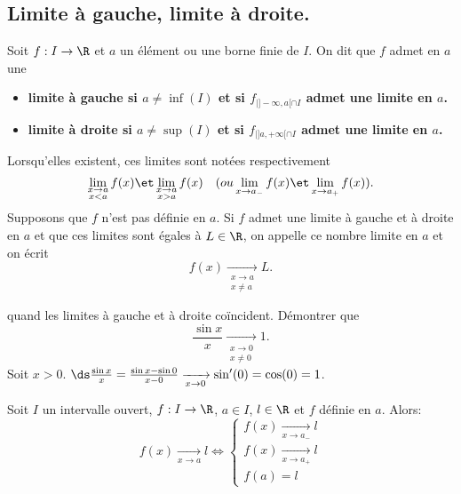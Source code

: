 \documentclass[11pt]{article}
\begin{document}
\subsection{Limite à gauche, limite à droite.}

\begin{defi}{}{}
    Soit $f:I\to\R$ et $a$ un élément ou une borne finie de $I$. On dit que $f$ admet en $a$ une
    \begin{itemize}
        \item \bf{limite à gauche} si $a\neq\inf(I)$ et si $f_{|]-\infty,a[\cap I}$ admet une limite en $a$.
        \item \bf{limite à droite} si $a\neq\sup(I)$ et si $f_{|]a,+\infty[\cap I}$ admet une limite en $a$.
    \end{itemize}
    Lorsqu'elles existent, ces limites sont notées respectivement
    \begin{equation*}
        \lim_{\substack{x\to a\\ x<a}}f(x)\et\lim_{\substack{x\to a\\ x>a}}f(x) \quad (ou \lim_{x\to a_-}f(x) \et \lim_{x\to a_+} f(x)).
    \end{equation*}
    Supposons que $f$ n'est pas définie en $a$. Si $f$ admet une limite à gauche et à droite en $a$ et que ces limites sont égales à $L\in\R$, on appelle ce nombre limite en $a$ et on écrit
    \begin{equation*}
        f(x)\xrightarrow[\substack{x\to a\\ x \neq a}]{}L.
    \end{equation*}
\end{defi}

\vspace*{-0.4cm}

\begin{ex}{quand les limites à gauche et à droite coïncident.}{}
    Démontrer que
    \begin{equation*}
        \frac{\sin x}{x}\xrightarrow[\substack{x\to0\\x\neq0}]{}1.
    \end{equation*}
    \tcblower
    Soit $x>0$. $\ds\frac{\sin x}{x}=\frac{\sin x - \sin 0}{x-0}\xrightarrow[x\to 0]{}\sin'(0)=\cos(0)=1$.
\end{ex}

\begin{prop}{}{}
    Soit $I$ un intervalle ouvert, $f:I\to\R$, $a\in I$, $l\in\R$ et $f$ définie en $a$. Alors:
    \begin{equation*}
        f(x)\xrightarrow[x\to a]{}l \iff \begin{cases}f(x)\xrightarrow[x\to a_-]{}l\\f(x)\xrightarrow[x\to a_+]{}l\\f(a)=l\end{cases}
    \end{equation*}
\end{prop}
\end{document}
